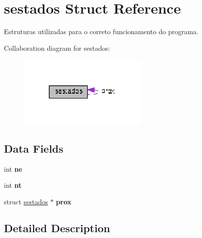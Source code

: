 \hypertarget{structsestados}{\section{sestados Struct Reference}
\label{structsestados}
}



\begin{DoxyItemize}
\item Estruturas utilizadas para o correto funcionamento do programa. 
\end{DoxyItemize} 




Collaboration diagram for sestados\+:\nopagebreak
\begin{figure}[H]
\begin{center}
\leavevmode
\includegraphics[width=182pt]{structsestados__coll__graph}
\end{center}
\end{figure}
\subsection*{Data Fields}
\begin{DoxyCompactItemize}
\item 
\hypertarget{structsestados_ab1e12f04caa9249050af9140d8bb43ef}{int {\bfseries ne}}\label{structsestados_ab1e12f04caa9249050af9140d8bb43ef}

\item 
\hypertarget{structsestados_a911517ed0c8acbdf708735e8b1027db8}{int {\bfseries nt}}\label{structsestados_a911517ed0c8acbdf708735e8b1027db8}

\item 
\hypertarget{structsestados_a9afdff2fdafac8a7824f0539bbe11003}{struct \hyperlink{structsestados}{sestados} $\ast$ {\bfseries prox}}\label{structsestados_a9afdff2fdafac8a7824f0539bbe11003}

\end{DoxyCompactItemize}


\subsection{Detailed Description}

